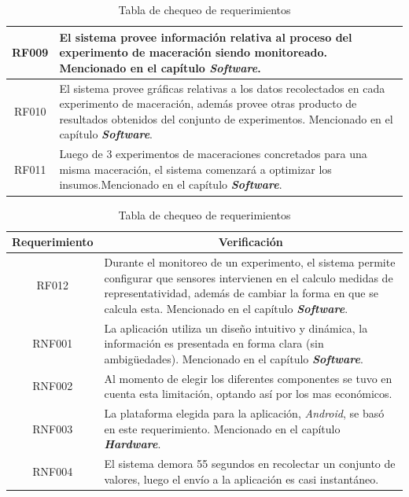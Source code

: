 \begin{table}[H]
\begin{tabularx}{\textwidth}{|X|X|}
        \hline
        \multicolumn{1}{|c|}{RF009}  & El sistema provee información relativa al proceso del experimento de maceración siendo monitoreado. Mencionado en el capítulo \textit{\textbf{Software}}.  \\
        \hline
        \multicolumn{1}{|c|}{RF010}  & El sistema provee gráficas relativas a los datos recolectados en cada experimento de maceración, además provee otras producto de resultados obtenidos del conjunto de experimentos. Mencionado en el capítulo \textit{\textbf{Software}}. \\
        \hline
        \multicolumn{1}{|c|}{RF011}  & Luego de 3 experimentos de maceraciones concretados para una misma maceración, el sistema comenzará a optimizar los insumos.Mencionado en el capítulo \textit{\textbf{Software}}. \\
        \hline
        \end{tabularx}
        \caption{Tabla de chequeo de requerimientos}
        \label{tab:TablaChequeoRequerimientos}
        \end{table}
        
         \begin{table}[H]
        \centering
        \begin{tabularx}{\textwidth}{|X|X|}
        \hline
        \multicolumn{1}{|c|}{Requerimiento} & \multicolumn{1}{|c|}{Verificación}\\
        \hline
        \multicolumn{1}{|c|}{RF012}  & Durante el monitoreo de un experimento, el sistema permite configurar que sensores intervienen en el calculo medidas de representatividad, además de cambiar la forma en que se calcula esta. Mencionado en el capítulo \textit{\textbf{Software}}. \\
        \hline
        \multicolumn{1}{|c|}{RNF001}  & La aplicación utiliza un diseño intuitivo y dinámica, la información es presentada en forma clara (sin ambigüedades). Mencionado en el capítulo \textit{\textbf{Software}}. \\
        \hline
        \multicolumn{1}{|c|}{RNF002}  & Al momento de elegir los diferentes componentes se tuvo en cuenta esta limitación, optando así por los mas económicos.\\
        \hline
        \multicolumn{1}{|c|}{RNF003}  & La plataforma elegida para la aplicación, \textit{Android},  se basó en este requerimiento. Mencionado en el capítulo \textit{\textbf{Hardware}}. \\
        \hline
        \multicolumn{1}{|c|}{RNF004}  & El sistema demora 55 segundos en recolectar un conjunto de valores, luego el envío a la aplicación es casi instantáneo. \\
        \hline
     \end{tabularx}
     \caption{Tabla de chequeo de requerimientos}
 \end{table}

